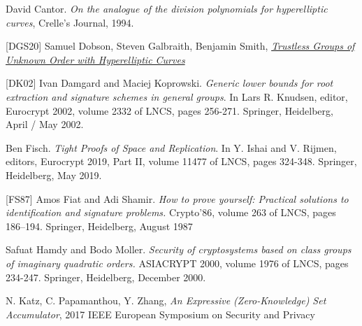 \documentclass[11pt, lettersize, notitlepage, leqno, footskip=0.6cm]{article}
\newcommand{\noin}{\noindent}
\numberwithin{equation}{section}
\begin{document}
\noin [Can94] David Cantor. \textit{On the analogue of the division polynomials for hyperelliptic curves}, Crelle's Journal, 1994.\vspace{0.1cm}


\noin \hypertarget{DGS20}{[DGS20]} Samuel Dobson, Steven Galbraith, Benjamin Smith, \href{https://eprint.iacr.org/2020/196}{\textit{Trustless Groups of Unknown Order with Hyperelliptic Curves}} \vspace{0.1cm}

\noin \hypertarget{{DK02}}{[DK02]} Ivan Damgard and Maciej Koprowski. \textit{Generic lower bounds for root extraction and signature schemes in general groups}. In Lars R. Knudsen, editor, Eurocrypt 2002, volume 2332 of LNCS, pages 256-271. Springer, Heidelberg, April / May 2002.\vspace{0.1cm}

\noin [Fis18] Ben Fisch. \textit{Tight Proofs of Space and Replication}. In Y. Ishai and V. Rijmen, editors, Eurocrypt 2019, Part II, volume 11477 of LNCS, pages 324-348. Springer, Heidelberg, May 2019. \vspace{0.1cm}

\noin \hypertarget{FS87}{[FS87]} Amos Fiat and Adi Shamir. \textit{How to prove yourself: Practical solutions to identification and signature problems.} Crypto’86, volume 263 of LNCS, pages 186–194. Springer, Heidelberg, August 1987\vspace{0.1cm}

\noin [HM00] Safuat Hamdy and Bodo Moller. \textit{Security of cryptosystems based on class groups of imaginary quadratic orders.} ASIACRYPT 2000, volume 1976 of LNCS, pages 234-247.
Springer, Heidelberg, December 2000.\vspace{0.1cm}

\noin [KPZ17] N. Katz, C. Papamanthou, Y. Zhang, \textit{An Expressive (Zero-Knowledge) Set Accumulator}, 2017 IEEE European Symposium on Security and Privacy \vspace{0.1cm}
\end{document}
